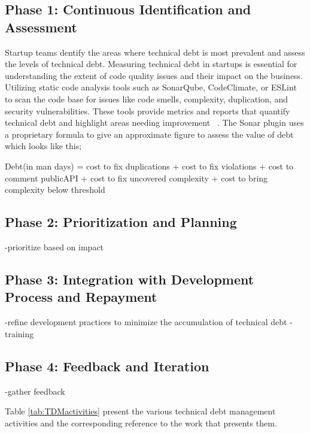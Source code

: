 \subsection{ Phase 1: Continuous Identification and Assessment}
Startup teams dentify the areas where technical debt is most prevalent and assess the levels of technical debt.
Measuring technical debt in startups is essential for understanding the extent of code quality issues and their impact on the business.
Utilizing static code analysis tools such as SonarQube, CodeClimate, or ESLint to scan the code base for issues like code smells, complexity, duplication, and security vulnerabilities. These tools provide metrics and reports that quantify technical debt and highlight areas needing improvement ~\cite{Whopayso60:online}. The Sonar plugin uses a proprietary formula to give an approximate figure to assess the value of debt which looks like this;

Debt(in man days) = cost to fix duplications + cost to fix violations + cost to comment publicAPI + cost to fix uncovered complexity + cost to bring complexity below threshold

\subsection{Phase 2: Prioritization and Planning}
-prioritize based on impact

\subsection{Phase 3: Integration with Development Process and Repayment}
-refine development practices to minimize the accumulation of technical debt
-training

\subsection{Phase 4: Feedback and Iteration}
-gather feedback

Table \ref{tab:TDMactivities} present the various technical debt management activities and the corresponding reference to the work that presents them.

